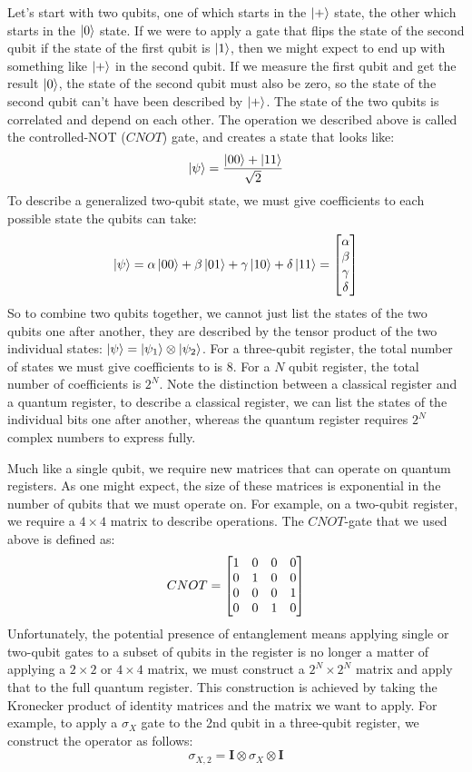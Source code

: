 Let's start with two qubits, one of which starts in the $\ket{+}$ state, the other which starts in
the $\ket{0}$ state. If we were to apply a gate that flips the state of the second qubit if the state of
the first qubit is $\ket{1}$, then we might expect to end up with something like $\ket{+}$ in the second
qubit. If we measure the first qubit and get the result $\ket{0}$, the state of the second qubit must also
be zero, so the state of the second qubit can't have been described by $\ket{+}$. The state of the two
qubits is correlated and depend on each other. The operation we described above is called the
controlled-NOT ($CNOT$) gate, and creates a state that looks like:
\begin{equation}
  \ket{\psi} = \frac{\ket{00} + \ket{11}}{\sqrt{2}}
\end{equation}
To describe a generalized two-qubit state, we must give coefficients to each possible state the qubits
can take:
\begin{equation}
  \ket{\psi} = \alpha\ket{00} + \beta\ket{01} + \gamma\ket{10} + \delta\ket{11} =
    \begin{bmatrix}\alpha\\\beta\\\gamma\\\delta\end{bmatrix}
\end{equation}
So to combine two qubits together, we cannot just list the states of the two qubits one after another,
they are described by the tensor product of the two individual states: $\ket{\psi} = \ket{\psi_1}\otimes\ket{\psi_2}$.
For a three-qubit register, the total number of states we must give coefficients to is 8. For a $N$ qubit
register, the total number of coefficients is $2^N$. Note the distinction between a classical register
and a quantum register, to describe a classical register, we can list the states of the individual
bits one after another, whereas the quantum register requires $2^N$ complex numbers to express fully.

Much like a single qubit, we require new matrices that can operate on quantum registers. As one
might expect, the size of these matrices is exponential in the number of qubits that we must operate on.
For example, on a two-qubit register, we require a $4 \times 4$ matrix to describe operations. The
$CNOT$-gate that we used above is defined as:
\begin{equation}
  CNOT = \begin{bmatrix}1&0&0&0\\0&1&0&0\\0&0&0&1\\0&0&1&0\end{bmatrix}
\end{equation}
Unfortunately, the potential presence of entanglement means applying single or two-qubit gates to a subset
of qubits in the register is no longer a matter of applying a $2 \times 2$ or $4 \times 4$ matrix, we must
construct a $2^N \times 2^N$ matrix and apply that to the full quantum register. This construction is achieved
by taking the Kronecker product of identity matrices and the matrix we want to apply. For example, to apply
a $\sigma_X$ gate to the 2nd qubit in a three-qubit register, we construct the operator as follows:
\begin{equation}
  \sigma_{X,2} = \boldsymbol{I} \otimes \sigma_X \otimes \boldsymbol{I}
\end{equation}

